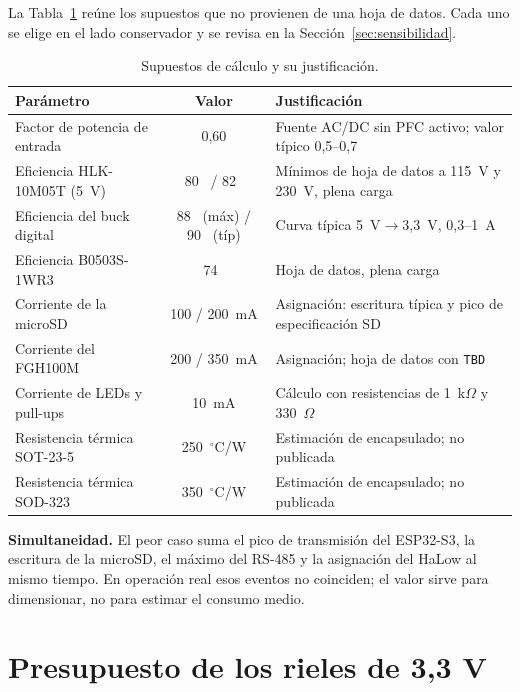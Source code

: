 \documentclass[11pt,a4paper]{article}
\newcommand{\pct}{\text{\char37}}
\begin{document}
La Tabla~\ref{tab:supuestos} reúne los supuestos que no provienen de una hoja de
datos. Cada uno se elige en el lado conservador y se revisa en la
Sección~\ref{sec:sensibilidad}.

\begin{table}[H]
\centering
\caption{Supuestos de cálculo y su justificación.}
\label{tab:supuestos}
\small
\begin{tabularx}{\textwidth}{@{}l c X@{}}
\toprule
\textbf{Parámetro} & \textbf{Valor} & \textbf{Justificación} \\
\midrule
Factor de potencia de entrada & 0,60 & Fuente AC/DC sin PFC activo; valor típico 0,5--0,7 \\
Eficiencia HLK-10M05T (5~V) & 80~\pct{} / 82~\pct & Mínimos de hoja de datos a 115~V y 230~V, plena carga \\
Eficiencia del buck digital & 88~\pct{} (máx) / 90~\pct{} (típ) & Curva típica 5~V$\to$3,3~V, 0,3--1~A \\
Eficiencia B0503S-1WR3 & 74~\pct & Hoja de datos, plena carga \\
Corriente de la microSD & 100 / 200~mA & Asignación: escritura típica y pico de especificación SD \\
Corriente del FGH100M & 200 / 350~mA & Asignación; hoja de datos con \texttt{TBD} \\
Corriente de LEDs y pull-ups & 10~mA & Cálculo con resistencias de 1~k$\Omega$ y 330~$\Omega$ \\
Resistencia térmica SOT-23-5 & 250~$^\circ$C/W & Estimación de encapsulado; no publicada \\
Resistencia térmica SOD-323 & 350~$^\circ$C/W & Estimación de encapsulado; no publicada \\
\bottomrule
\end{tabularx}
\end{table}

\noindent\textbf{Simultaneidad.} El peor caso suma el pico de transmisión del
ESP32-S3, la escritura de la microSD, el máximo del RS-485 y la asignación del
HaLow al mismo tiempo. En operación real esos eventos no coinciden; el valor
sirve para dimensionar, no para estimar el consumo medio.

\section{Presupuesto de los rieles de 3,3 V}
\label{sec:rieles33}
\end{document}
